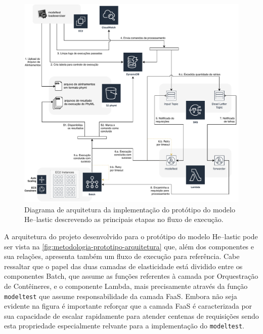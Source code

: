 \documentclass[english,brazilian]{UNISINOSmonografia} %
\begin{document}
\begin{figure}[tp]
	\centering%
	\begin{minipage}{\textwidth}
		\caption{Diagrama de arquitetura da implementação do protótipo do modelo \textsf{He}--lastic descrevendo as principais etapas no fluxo de execução.}
		\label{fig:metodologia-prototipo-arquitetura}
		\vspace{1ex}
		\includegraphics[width=\textwidth]{prototipo-arquitetura}
	\end{minipage}
\end{figure}


A arquitetura do projeto desenvolvido para o protótipo do modelo \textsf{He}--lastic pode ser vista na \autoref{fig:metodologia-prototipo-arquitetura} que, além dos componentes e sua relações, apresenta também um fluxo de execução para referência.
%
Cabe ressaltar que o papel das duas camadas de elasticidade está dividido entre os componentes Batch, que assume as funções referentes à camada por Orquestração de Contêineres, e o componente Lambda, mais precisamente através da função \texttt{modeltest} que assume responsabilidade da camada FaaS.
%
Embora não seja evidente na figura é importante reforçar que a camada FaaS é caracterizada por sua capacidade de escalar rapidamente para atender centenas de requisições sendo esta propriedade especialmente relvante para a implementação do \texttt{modeltest}.
\end{document}
